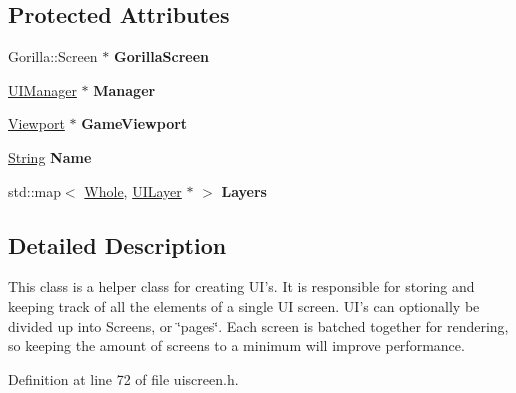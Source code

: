 \subsection*{Protected Attributes}
\begin{DoxyCompactItemize}
\item 
\hypertarget{classphys_1_1UIScreen_a6cc0cb1a19c2b2a8cee20222d1af333c}{
Gorilla::Screen $\ast$ {\bfseries GorillaScreen}}
\label{d9/de8/classphys_1_1UIScreen_a6cc0cb1a19c2b2a8cee20222d1af333c}

\item 
\hypertarget{classphys_1_1UIScreen_a8cb86a27b0ac39426ae23e67e34ebd47}{
\hyperlink{classphys_1_1UIManager}{UIManager} $\ast$ {\bfseries Manager}}
\label{d9/de8/classphys_1_1UIScreen_a8cb86a27b0ac39426ae23e67e34ebd47}

\item 
\hypertarget{classphys_1_1UIScreen_a925f63ce04a6dee96df78f031928c0b7}{
\hyperlink{classphys_1_1Viewport}{Viewport} $\ast$ {\bfseries GameViewport}}
\label{d9/de8/classphys_1_1UIScreen_a925f63ce04a6dee96df78f031928c0b7}

\item 
\hypertarget{classphys_1_1UIScreen_a513aebb318ba6e21fcc95090c4385614}{
\hyperlink{namespacephys_aa03900411993de7fbfec4789bc1d392e}{String} {\bfseries Name}}
\label{d9/de8/classphys_1_1UIScreen_a513aebb318ba6e21fcc95090c4385614}

\item 
\hypertarget{classphys_1_1UIScreen_aab6876d055853ed554e1ab09d0e91ce0}{
std::map$<$ \hyperlink{namespacephys_a460f6bc24c8dd347b05e0366ae34f34a}{Whole}, \hyperlink{classphys_1_1UILayer}{UILayer} $\ast$ $>$ {\bfseries Layers}}
\label{d9/de8/classphys_1_1UIScreen_aab6876d055853ed554e1ab09d0e91ce0}

\end{DoxyCompactItemize}


\subsection{Detailed Description}
This class is a helper class for creating UI's. It is responsible for storing and keeping track of all the elements of a single UI screen. UI's can optionally be divided up into Screens, or \char`\"{}pages\char`\"{}. Each screen is batched together for rendering, so keeping the amount of screens to a minimum will improve performance. 

Definition at line 72 of file uiscreen.h.



